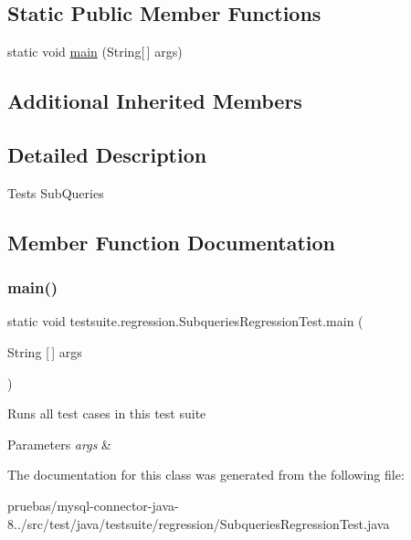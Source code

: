 \subsection*{Static Public Member Functions}
\begin{DoxyCompactItemize}
\item 
static void \mbox{\hyperlink{classtestsuite_1_1regression_1_1_subqueries_regression_test_a12104698d6c112af5a803f335cce6b97}{main}} (String\mbox{[}$\,$\mbox{]} args)
\end{DoxyCompactItemize}
\subsection*{Additional Inherited Members}


\subsection{Detailed Description}
Tests Sub\+Queries 

\subsection{Member Function Documentation}
\mbox{\label{classtestsuite_1_1regression_1_1_subqueries_regression_test_a12104698d6c112af5a803f335cce6b97}} 
\subsubsection{\texorpdfstring{main()}{main()}}
{\footnotesize\ttfamily static void testsuite.\+regression.\+Subqueries\+Regression\+Test.\+main (\begin{DoxyParamCaption}\item[{String \mbox{[}$\,$\mbox{]}}]{args }\end{DoxyParamCaption})\hspace{0.3cm}{\ttfamily [static]}}

Runs all test cases in this test suite


\begin{DoxyParams}{Parameters}
{\em args} & \\
\hline
\end{DoxyParams}


The documentation for this class was generated from the following file\+:\begin{DoxyCompactItemize}
\item 
pruebas/mysql-\/connector-\/java-\/8../src/test/java/testsuite/regression/Subqueries\+Regression\+Test.\+java\end{DoxyCompactItemize}
